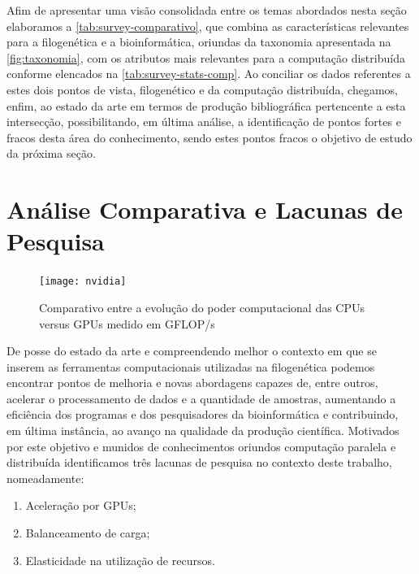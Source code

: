 \documentclass[english,brazilian]{UNISINOSmonografia} %
\newcommand\defaultFigureWidth{0.9}
\begin{document}
Afim de apresentar uma visão consolidada entre os temas abordados nesta seção elaboramos a \autoref{tab:survey-comparativo}, que combina as características relevantes para a filogenética e a bioinformática, oriundas da taxonomia apresentada na \autoref{fig:taxonomia}, com os atributos mais relevantes para a computação distribuída conforme elencados na \autoref{tab:survey-stats-comp}.
Ao conciliar os dados referentes a estes dois pontos de vista, filogenético e da computação distribuída, chegamos, enfim, ao estado da arte em termos de produção bibliográfica pertencente a esta intersecção, possibilitando, em última análise, a identificação de pontos fortes e fracos desta área do conhecimento, sendo estes pontos fracos o objetivo de estudo da próxima seção.




\section{Análise Comparativa e Lacunas de Pesquisa}
\label{sec:lacunas-de-pesquisa}


\begin{figure}[tb]
	\centering%
	\begin{minipage}{\defaultFigureWidth\textwidth}
		\caption{Comparativo entre a evolução do poder computacional das CPUs versus GPUs medido em GFLOP/s}
		\label{fig:gpu-power}
		\vspace{1ex}
		\texttt{[image: nvidia]}
	\end{minipage}
\end{figure}

De posse do estado da arte e compreendendo melhor o contexto em que se inserem as ferramentas computacionais utilizadas na filogenética podemos encontrar pontos de melhoria e novas abordagens capazes de, entre outros, acelerar o processamento de dados e a quantidade de amostras, aumentando a eficiência dos programas e dos pesquisadores da bioinformática e contribuindo, em última instância, ao avanço na qualidade da produção científica.
Motivados por este objetivo e munidos de conhecimentos oriundos computação paralela e distribuída \cite{Righi2013,Aubin2016,Aubin2017} 
identificamos três lacunas de pesquisa no contexto deste trabalho, nomeadamente: 
\begin{enumerate}[label=Lacuna~\arabic*:~,itemindent=*]
	\item Aceleração por GPUs;
	\item Balanceamento de carga;
	\item Elasticidade na utilização de recursos.
\end{enumerate}
\end{document}
